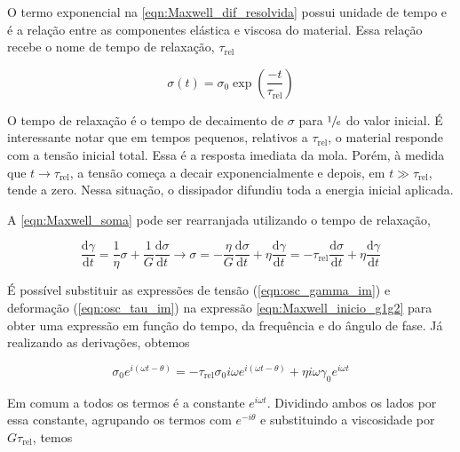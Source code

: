 			O termo exponencial na \autoref{eqn:Maxwell_dif_resolvida} possui unidade de tempo e é a relação entre as componentes elástica e viscosa do material. Essa relação recebe o nome de tempo de relaxação, \(\tau_{\mathrm{rel}}\)
			
			\begin{equation}
				\sigma(t) = \sigma_0 \exp \left(\dfrac{-t}{\tau_{\textrm{rel}}}\right)
				\label{eqn:Maxwell_tempo_rel_def}
			\end{equation}
		
			O tempo de relaxação é o tempo de decaimento de \(\sigma\) para \(\sfrac{1}{e}\) do valor inicial. É interessante notar que em tempos pequenos, relativos a \(\tau_{\mathrm{rel}}\), o material responde com a tensão inicial total. Essa é a resposta imediata da mola. Porém, à medida que \(t\to\tau_{\mathrm{rel}}\), a tensão começa a decair exponencialmente e depois, em \(t \gg \tau_{\mathrm{rel}}\), tende a zero. Nessa situação, o dissipador difundiu toda a energia inicial aplicada.
			
			A \autoref{eqn:Maxwell_soma} pode ser rearranjada utilizando o tempo de relaxação,
			
			\begin{equation}
				\dfrac{\mathrm{d}\gamma}{\mathrm{d}t} = \dfrac{1}{\eta}\sigma + \dfrac{1}{G}\dfrac{\mathrm{d}\sigma}{\mathrm{d}t} \to 
				\sigma = -\dfrac{\eta}{G} \dfrac{\mathrm{d}\sigma}{\mathrm{d}t} + \eta\dfrac{\mathrm{d}\gamma}{\mathrm{d}t} =
				-\tau_{\textrm{rel}} \dfrac{\mathrm{d}\sigma}{\mathrm{d}t} + \eta\dfrac{\mathrm{d}\gamma}{\mathrm{d}t}
				\label{eqn:Maxwell_inicio_g1g2}
			\end{equation}
			
			É possível substituir as expressões de tensão (\ref{eqn:osc_gamma_im}) e deformação (\ref{eqn:osc_tau_im}) na expressão \ref{eqn:Maxwell_inicio_g1g2} para obter uma expressão em função do tempo, da frequência e do ângulo de fase. Já realizando as derivações, obtemos
			
			\begin{equation}
				\sigma_0 e^{i \left( \omega t - \theta \right)} = - \tau_{\textrm{rel}} \sigma_0 i\omega e^{i \left( \omega t - \theta \right)}     +       \eta i\omega\gamma_0e^{i\omega t}
				\label{eqn:Maxwell_substituicao}
			\end{equation}
			
			Em comum a todos os termos é a constante \(e^{i\omega t}\). Dividindo ambos os lados por essa constante, agrupando os termos com \(e^{-i\theta}\) e substituindo a viscosidade por \(G\tau_{\mathrm{rel}}\), temos
			
